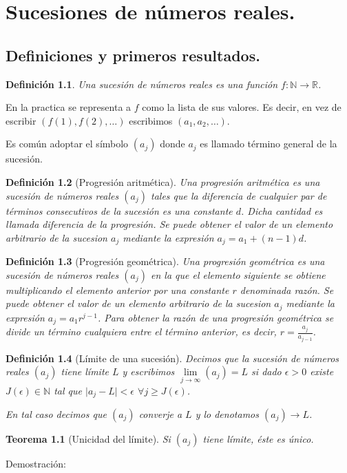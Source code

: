 \documentclass[12pt]{book}
\newcommand\R{{\mathbb R}}
\newcommand\N{{\mathbb N}}
\providecommand{\abs}[1]{\lvert#1\rvert}
\newtheorem{teo}{Teorema}[section]
\newtheorem{defi}{Definición}[section]
\begin{document}
\chapter{Sucesiones de números reales.}
\section{Definiciones y primeros resultados.}
\begin{defi}\rm
Una sucesión de números reales es una función $f:\N \rightarrow \R$.
\end{defi}
En la practica se representa a $f$ como la lista de sus valores. Es decir, en vez de escribir $(f(1),f(2),\dots)$ escribimos $(a_{1},a_{2},\dots)$.

Es común adoptar el símbolo $(a_{j})$ donde $a_j$ es llamado término general de la sucesión.
\begin{defi}[Progresión aritmética]\rm
Una progresión aritmética es una sucesión de números reales $(a_j)$ tales que la diferencia de cualquier par de términos consecutivos de la sucesión es una constante $d$. Dicha cantidad es llamada diferencia de la progresión. Se puede obtener el valor de un elemento arbitrario de la sucesion $a_j$ mediante la expresión $a_j=a_1+(n-1)d$.
\end{defi}
\begin{defi}[Progresión geométrica]\label{ProgresionGeo}\rm
Una progresión geométrica es una sucesión de números reales $(a_j)$ en la que el elemento siguiente se obtiene multiplicando el elemento anterior por una constante $r$ denominada razón. Se puede obtener el valor de un elemento arbitrario de la sucesion $a_j$ mediante la expresión $a_j=a_1r^{j-1}$.
Para obtener la razón de una progresión geométrica se divide un término cualquiera entre el término anterior, es decir, $r=\frac{a_j}{a_{j-1}}$.
\end{defi}
\begin{defi}[Límite de una sucesión]\rm\label{LimiteSucesion}
Decimos que la sucesión de números reales $(a_j)$  tiene límite $L$ y escribimos $\lim\limits_{j\to\infty}(a_{j})=L$ si dado $\epsilon>0$ existe $J(\epsilon)\in\N$ tal que $\abs{a_{j}-L}<\epsilon$ $\forall{j \ge J(\epsilon)}$.

En tal caso decimos que $(a_{j})$ converje a $L$ y lo denotamos $(a_{j})\rightarrow L$.
\end{defi}
\begin{teo}[Unicidad del límite]\rm
Si $(a_{j})$ tiene límite, éste es único.
\end{teo}
Demostración:
\end{document}
